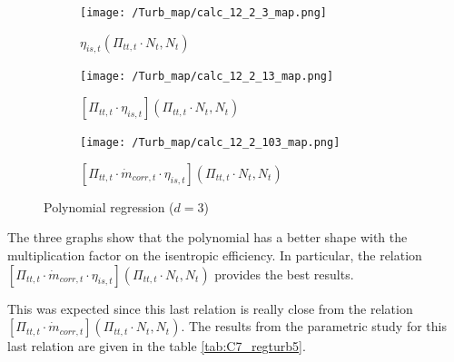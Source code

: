 \begin{figure}[H]
    \centering
    \begin{subfigure}[b]{0.4\textwidth}
        \centering
        \texttt{[image: /Turb\_map/calc\_12\_2\_3\_map.png]}
        \caption{$\eta_{is,t}(\Pi_{tt,t}\cdot N_t,N_t)$}
        \label{fig:C7_etaturbevo0}
    \end{subfigure}
    \begin{subfigure}[b]{0.4\textwidth}
        \centering
        \texttt{[image: /Turb\_map/calc\_12\_2\_13\_map.png]}
        \caption{$[\Pi_{tt,t}\cdot\eta_{is,t}](\Pi_{tt,t}\cdot N_t,N_t)$}
        \label{fig:C7_etaturbevo1}
    \end{subfigure}
    \begin{subfigure}[b]{0.4\textwidth}
        \centering
        \texttt{[image: /Turb\_map/calc\_12\_2\_103\_map.png]}
        \caption{$[\Pi_{tt,t}\cdot \dot{m}_{corr,t}\cdot\eta_{is,t}](\Pi_{tt,t}\cdot N_t,N_t)$}
        \label{fig:C7_etaturbevo2}
    \end{subfigure}
    \caption{Polynomial regression ($d=3$)} \label{fig:C7_etaturbevo}
\end{figure}
The three graphs show that the polynomial has a better shape with the multiplication factor on the isentropic efficiency. In particular, the relation $[\Pi_{tt,t}\cdot \dot{m}_{corr,t}\cdot\eta_{is,t}](\Pi_{tt,t}\cdot N_t,N_t)$ provides the best results.

This was expected since this last relation is really close from the relation $[\Pi_{tt,t}\cdot \dot{m}_{corr,t}](\Pi_{tt,t}\cdot N_t,N_t)$. The results from the parametric study for this last relation are given in the table \ref{tab:C7_regturb5}.

